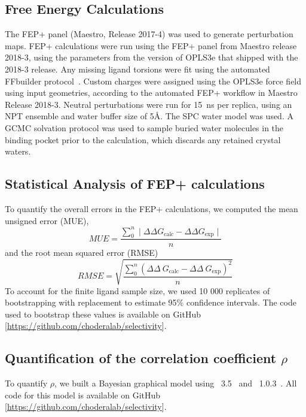 \documentclass[phd,tocprelim]{cornell}
\begin{document}
\subsection{Free Energy Calculations}

The FEP+ panel (Maestro, Release 2017-4) was used to generate perturbation maps. FEP+ calculations were run using the FEP+ panel from Maestro release 2018-3, using the parameters from the version of OPLS3e that shipped with the 2018-3 release. Any missing ligand torsions were fit using the automated FFbuilder protocol~\citep{Abel2017-gw}. 
Custom charges were assigned using the OPLS3e force field using input geometries, according to the automated FEP+ workflow in Maestro Release 2018-3. Neutral perturbations were run for 15~ns per replica, using an NPT ensemble and water buffer size of 5\AA. 
The SPC water model was used. 
A GCMC solvation protocol was used to sample buried water molecules in the binding pocket prior to the calculation, which discards any retained crystal waters. 

\subsection{Statistical Analysis of FEP+ calculations}
To quantify the overall errors in the FEP+ calculations, we computed the mean unsigned error (MUE),
\begin{equation}\label{eq:sample-mue}
MUE = \frac{ \sum_{0}^{n} \mid \Delta \Delta G _\text{calc} - \Delta \Delta G _\text{exp} \mid}{n}
\end{equation}
and the root mean squared error (RMSE)
\begin{equation}\label{eq:sample-rmse}
RMSE = \sqrt{\frac{ \sum_{0}^{n}(\Delta \Delta~G_\text{calc} - \Delta \Delta~G_\text{exp})^2}{n}}
\end{equation}
To account for the finite ligand sample size, we used 10 000 replicates of bootstrapping with replacement to estimate  95\% confidence intervals.
The code used to bootstrap these values is available on GitHub [\url{https://github.com/choderalab/selectivity}].


\subsection{Quantification of the correlation coefficient $\rho$}
To quantify $\rho$, we built a Bayesian graphical model using ~3.5~\citep{Salvatier:2016ki} and ~1.0.3~\citep{2016arXiv160502688full}.
All code for this model is available on GitHub [\url{https://github.com/choderalab/selectivity}].
\end{document}
